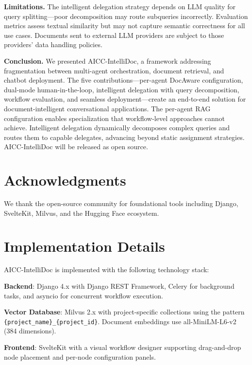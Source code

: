 \documentclass[11pt]{article}
\begin{document}
\textbf{Limitations.} The intelligent delegation strategy depends on LLM quality for query splitting—poor decomposition may route subqueries incorrectly. Evaluation metrics assess textual similarity but may not capture semantic correctness for all use cases. Documents sent to external LLM providers are subject to those providers' data handling policies.

\textbf{Conclusion.} We presented AICC-IntelliDoc, a framework addressing fragmentation between multi-agent orchestration, document retrieval, and chatbot deployment. The five contributions—per-agent DocAware configuration, dual-mode human-in-the-loop, intelligent delegation with query decomposition, workflow evaluation, and seamless deployment—create an end-to-end solution for document-intelligent conversational applications. The per-agent RAG configuration enables specialization that workflow-level approaches cannot achieve. Intelligent delegation dynamically decomposes complex queries and routes them to capable delegates, advancing beyond static assignment strategies. AICC-IntelliDoc will be released as open source.


\section*{Acknowledgments}

We thank the open-source community for foundational tools including Django, SvelteKit, Milvus, and the Hugging Face ecosystem.





\appendix

\section{Implementation Details}
\label{app:implementation}

AICC-IntelliDoc is implemented with the following technology stack:

\textbf{Backend}: Django 4.x with Django REST Framework, Celery for background tasks, and asyncio for concurrent workflow execution.

\textbf{Vector Database}: Milvus 2.x with project-specific collections using the pattern \texttt{\{project\_name\}\_\{project\_id\}}. Document embeddings use all-MiniLM-L6-v2 (384 dimensions).

\textbf{Frontend}: SvelteKit with a visual workflow designer supporting drag-and-drop node placement and per-node configuration panels.
\end{document}

